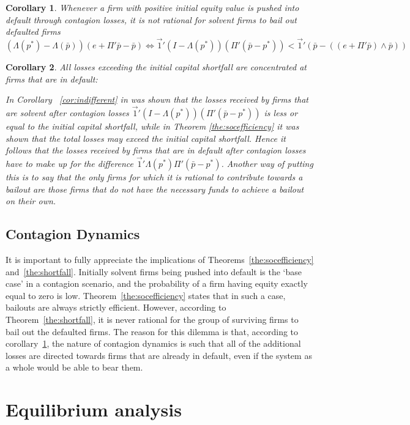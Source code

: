 \documentclass[12pt,a4paper]{article}
\newtheorem{corollary}{Corollary}
\begin{document}
\begin{corollary} \label{cor:rational}
Whenever a firm with positive initial equity value is pushed into default through contagion losses, it is not rational for solvent firms to bail out defaulted firms
\[
(\Lambda(p^* )-\Lambda(\bar{p}))(e+\Pi' \bar{p}-\bar{p}) \Leftrightarrow \vec{1}' (I-\Lambda(p^* ))(\Pi' (\bar{p}-p^* ))<\vec{1}' (\bar{p}-((e+\Pi' \bar{p}) \wedge \bar{p}))
\]
\end{corollary}

\begin{corollary} \label{cor:losses}
All losses exceeding the initial capital shortfall are concentrated at firms that are in default: 

In Corollary ~\ref{cor:indifferent} in was shown that the losses received by firms that are solvent after contagion losses $\vec{1}' (I-\Lambda(p^* ))(\Pi' (\bar{p}-p^* ))$ is less or equal to the initial capital shortfall, while in Theorem \ref{the:socefficiency} it was shown that the total losses may exceed the initial capital shortfall. Hence it follows that the losses received by firms that are in default after contagion losses have to make up for the difference $\vec{1}' \Lambda(p^* ) \Pi' (\bar{p}-p^* )$. Another way of putting this is to say that the only firms for which it is rational to contribute towards a bailout are those firms that do not have the necessary funds to achieve a bailout on their own.
\end{corollary}

\subsection{Contagion Dynamics}
It is important to fully appreciate the implications of Theorems~\ref{the:socefficiency} and~\ref{the:shortfall}. Initially solvent firms being pushed into default is the ‘base case’ in a contagion scenario, and the probability of a firm having equity exactly equal to zero is low. Theorem~\ref{the:socefficiency} states that in such a case, bailouts are always strictly efficient. However, according to Theorem~\ref{the:shortfall}, it is never rational for the group of surviving firms to bail out the defaulted firms. The reason for this dilemma is that, according to corollary~\ref{cor:rational}, the nature of contagion dynamics is such that all of the additional losses are directed towards firms that are already in default, even if the system as a whole would be able to bear them. 

\section{Equilibrium analysis}
\label{sec:equilibrium}
\end{document}
